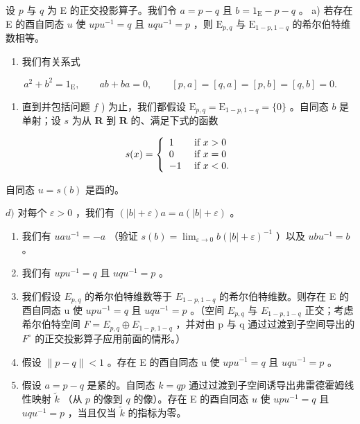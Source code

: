 设 \(p\) 与 \(q\) 为 E 的正交投影算子。我们令 \(a = p - q\) 且 \(b = 1_{\mathrm{E}} - p - q\) 。 a) 若存在 E 的酉自同态 \(u\) 使 \(upu^{-1} = q\) 且 \(uqu^{-1} = p\) ，则 \(\mathrm{E}_{p,q}\) 与 \(\mathrm{E}_{1 - p,1 - q}\) 的希尔伯特维数相等。

\begin{enumerate}
\def\labelenumi{\alph{enumi})}
\setcounter{enumi}{1}
\tightlist
\item
  我们有关系式
\end{enumerate}

\[
a ^ {2} + b ^ {2} = 1 _ {\mathrm{E}}, \qquad a b + b a = 0, \qquad [ p, a ] = [ q, a ] = [ p, b ] = [ q, b ] = 0.
\]

\begin{enumerate}
\def\labelenumi{\alph{enumi})}
\setcounter{enumi}{2}
\tightlist
\item
  直到并包括问题 \(f\) ) 为止，我们都假设 \(\mathrm{E}_{p,q} = \mathrm{E}_{1 - p,1 - q} = \{0\}\) 。自同态 \(b\) 是单射；设 \(s\) 为从 \(\mathbf{R}\) 到 \(\mathbf{R}\) 的、满足下式的函数
\end{enumerate}

\[
s (x) = \left\{ \begin{array}{l l} 1 & \text { if } x > 0 \\ 0 & \text { if } x = 0 \\ - 1 & \text { if } x <   0. \end{array} \right.
\]

自同态 \(u = s(b)\) 是酉的。

\(d)\) 对每个 \(\varepsilon > 0\) ，我们有 \((|b| + \varepsilon)a = a(|b| + \varepsilon)\) 。

\begin{enumerate}
\def\labelenumi{\alph{enumi})}
\setcounter{enumi}{4}
\item
  我们有 \(uau^{-1} = -a\) （验证 \(s(b) = \lim_{\varepsilon \to 0} b(|b| + \varepsilon)^{-1}\) ）以及 \(ubu^{-1} = b\) 。
\item
  我们有 \(upu^{-1} = q\) 且 \(uqu^{-1} = p\) 。
\item
  我们假设 \(E_{p,q}\) 的希尔伯特维数等于 \(E_{1-p,1-q}\) 的希尔伯特维数。则存在 E 的酉自同态 u 使 \(upu^{-1} = q\) 且 \(uqu^{-1} = p\) 。（空间 \(E_{p,q}\) 与 \(E_{1-p,1-q}\) 正交；考虑希尔伯特空间 \(F = E_{p,q} \oplus E_{1-p,1-q}\) ，并对由 p 与 q 通过过渡到子空间导出的 \(F^{\circ}\) 的正交投影算子应用前面的情形。）
\item
  假设 \(\|p-q\|<1\) 。存在 E 的酉自同态 u 使 \(upu^{-1}=q\) 且 \(uqu^{-1}=p\) 。
\item
  假设 \(a = p - q\) 是紧的。自同态 \(k = qp\) 通过过渡到子空间诱导出弗雷德霍姆线性映射 \(\widetilde{k}\) （从 \(p\) 的像到 \(q\) 的像）。存在 E 的酉自同态 \(u\) 使 \(upu^{-1} = q\) 且 \(uqu^{-1} = p\) ，当且仅当 \(\widetilde{k}\) 的指标为零。
\end{enumerate}

